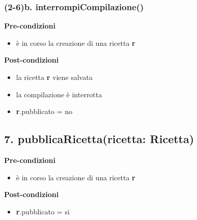 \documentclass[14pt]{extarticle}
\begin{document}
\subsubsection*{(2-6)b. interrompiCompilazione()}

\textbf{Pre-condizioni}
\begin{itemize}
  \item è in corso la creazione di una ricetta  \textbf{r}
\end{itemize}
\textbf{Post-condizioni}
\begin{itemize}
  \item la ricetta  \textbf{r} viene salvata
  \item la compilazione è interrotta
  \item \textbf{r}.pubblicato = no
\end{itemize}

\subsection*{7. pubblicaRicetta(ricetta: Ricetta)}

\textbf{Pre-condizioni}
\begin{itemize}
  \item è in corso la creazione di una ricetta  \textbf{r}
\end{itemize}
\textbf{Post-condizioni}
\begin{itemize}
  \item \textbf{r}.pubblicato = si
\end{itemize}
\end{document}
